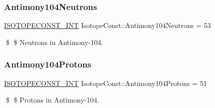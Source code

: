 \subsubsection{\texorpdfstring{Antimony104\+Neutrons}{Antimony104Neutrons}}
{\footnotesize\ttfamily \mbox{\hyperlink{group___isotope_const-_macros_ga5f18360b3e99483a35c32d789e62621c}{I\+S\+O\+T\+O\+P\+E\+C\+O\+N\+S\+T\+\_\+\+I\+NT}} Isotope\+Const\+::\+Antimony104\+Neutrons = 53}

\$ \$ Neutrons in Antimony-\/104. \mbox{\label{group___isotope_const-_antimony-_sb104_gaaf119784a92fe68459be1485dde40af3}} 
\subsubsection{\texorpdfstring{Antimony104\+Protons}{Antimony104Protons}}
{\footnotesize\ttfamily \mbox{\hyperlink{group___isotope_const-_macros_ga5f18360b3e99483a35c32d789e62621c}{I\+S\+O\+T\+O\+P\+E\+C\+O\+N\+S\+T\+\_\+\+I\+NT}} Isotope\+Const\+::\+Antimony104\+Protons = 51}

\$ \$ Protons in Antimony-\/104. 